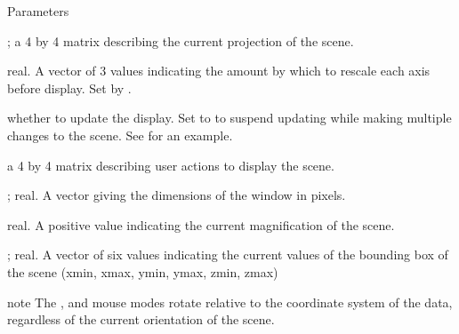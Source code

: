 \documentclass{article}
\begin{document}
\begin{Section}{Parameters}
{\item[\code{projMatrix}] \emph{}; a 4 by 4 matrix describing the current
projection of the scene.
\item[\code{scale}] real.  A vector of 3 values indicating the amount by which to
rescale each axis before display.  Set by .
\item[\code{skipRedraw}] whether to update the display.  Set to  to suspend
updating while making multiple changes to the scene.  See  for an example.
\item[\code{userMatrix}] a 4 by 4 matrix describing user actions to
display the scene.
\item[\code{viewport}] \emph{}; real.  A vector giving the dimensions of the
window in pixels.
\item[\code{zoom}] real. A positive value indicating the current
magnification of the scene.
\item[\code{bbox}] \emph{}; real. A vector of six values indicating the current values of the
bounding box of the scene (xmin, xmax, ymin, ymax, zmin, zmax)
}
\end{Section}
\begin{Section}{note}
The ,  and  mouse modes rotate relative to the coordinate
system of the data, regardless of the current orientation of the scene.
\end{Section}
\end{document}
